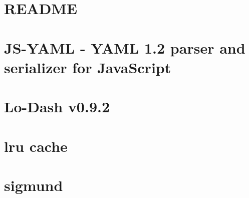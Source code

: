\documentclass[twoside]{book}
\newcommand{\+}{\discretionary{\mbox{\scriptsize$\hookleftarrow$}}{}{}}
\begin{document}
\chapter{R\+E\+A\+D\+M\+E}
\label{md__c_1__users_martin__documents__git_hub_visual_studio__bachelor__wis_r__wis_r_node_modules_gru7791b753e6cfe14140e55641e8e8d0c6}
\hypertarget{md__c_1__users_martin__documents__git_hub_visual_studio__bachelor__wis_r__wis_r_node_modules_gru7791b753e6cfe14140e55641e8e8d0c6}{}

\chapter{J\+S-\/\+Y\+A\+M\+L -\/ Y\+A\+M\+L 1.2 parser and serializer for Java\+Script}
\label{md__c_1__users_martin__documents__git_hub_visual_studio__bachelor__wis_r__wis_r_node_modules_grub547060f601bd98f0e50e48a6f7bc843}
\hypertarget{md__c_1__users_martin__documents__git_hub_visual_studio__bachelor__wis_r__wis_r_node_modules_grub547060f601bd98f0e50e48a6f7bc843}{}

\chapter{Lo-\/\+Dash v0.9.2}
\label{md__c_1__users_martin__documents__git_hub_visual_studio__bachelor__wis_r__wis_r_node_modules_gru71eb9910524e50047fe1d711d2d61bad}
\hypertarget{md__c_1__users_martin__documents__git_hub_visual_studio__bachelor__wis_r__wis_r_node_modules_gru71eb9910524e50047fe1d711d2d61bad}{}

\chapter{lru cache}
\label{md__c_1__users_martin__documents__git_hub_visual_studio__bachelor__wis_r__wis_r_node_modules_grue35648e21242efb0522bb3e0898bd54d}
\hypertarget{md__c_1__users_martin__documents__git_hub_visual_studio__bachelor__wis_r__wis_r_node_modules_grue35648e21242efb0522bb3e0898bd54d}{}

\chapter{sigmund}
\label{md__c_1__users_martin__documents__git_hub_visual_studio__bachelor__wis_r__wis_r_node_modules_gru0ede34e21755390bdc2045e743255f21}
\hypertarget{md__c_1__users_martin__documents__git_hub_visual_studio__bachelor__wis_r__wis_r_node_modules_gru0ede34e21755390bdc2045e743255f21}{}

\end{document}
